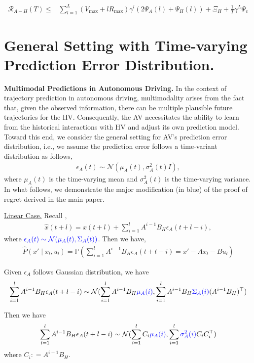     \begin{align*}
    \mathcal{R}_{A-H}(T) \leq &   \sum_{l=1}^L (V_{\max} + l R_{\max})\gamma^l (2\Psi_A(l) + \Psi_H(l))+\Xi_H  + \frac{1}{T} \gamma^L \Psi_v
\end{align*}

\section{General Setting with Time-varying Prediction Error Distribution.} \label{app:prediction_error}
{\bf Multimodal Predictions in Autonomous Driving.} In the context of trajectory prediction in autonomous driving, multimodality arises from the fact that, given the observed information, there can be multiple plausible future trajectories for the HV. Consequently, the AV necessitates the ability to learn from the historical interactions with HV and adjust its own prediction model. Toward this end, we consider the general setting for AV's prediction error distribution, i.e., we assume the prediction error follows a time-variant distribution as follows,
\begin{align}
    \epsilon_A(t) \sim \mathcal{N}(\mu_A(t),\sigma_A^2(t)I),
\end{align}
where $\mu_A(t)$ is the time-varying mean and $\sigma_A^2(t)$ is the time-varying variance. In what follows, we demonstrate the major modification (in blue) of the proof of regret derived in the main paper. 

\underline{Linear Case.} Recall , 
\begin{align*}
    \hat{x}(t+l) = x(t+l) + \sum_{i=1}^{l}A^{i-1}B_H\epsilon_A(t+l-i),
\end{align*}
where $ {\color{blue} \epsilon_A(t) \sim \mathcal{N}(\mu_A(t),\Sigma_A(t))}$. Then we have,
\begin{align*}
    \hat{P}\left(x' \mid x_l, u_l\right) = \mathbb{P}(\sum_{i=1}^{l}A^{i-1}B_H\epsilon_A(t+l-i) = x'-Ax_l-Bu_l)
\end{align*}

Given $\epsilon_A$ follows Gaussian distribution, we have
\begin{align*}
    \sum_{i=1}^{l}A^{i-1}B_H\epsilon_A(t+l-i) \sim \mathcal{N} (\sum_{i=1}^{l}A^{i-1}B_H {\color{blue} {\color{blue}\mu_A(i)}}, \sum_{i=1}^{l} A^{i-1}B_H {\color{blue}\Sigma_A(i)} (A^{i-1}B_H )^{\top}  )
\end{align*}

Then we have
\begin{align*}
     \sum_{i=1}^{l}A^{i-1}B_H\epsilon_A(t+l-i) \sim \mathcal{N} (\sum_{i=1}^l C_i  {\color{blue}\mu_A(i)},  \sum_{i=1}^l   {\color{blue}\sigma_A^2(i)} C_iC_i^{\top} )
\end{align*}
where $C_i : = A^{i-1}B_H$. 

